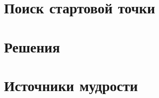 \documentclass[12pt, a4paper]{article}
\newcounter{problem}[section]
\begin{document}
\section*{Поиск стартовой точки}








\renewenvironment{solution}[1]{%
         \vskip .5cm plus 2cm minus 0.1cm%
         {\bfseries \hyperlink{problem:#1}{#1.}}%
}%
{%
}%

\newpage
\section{Решения}





\printindex %


\section*{Источники мудрости}




\printbibliography[heading=none]
\end{document}
